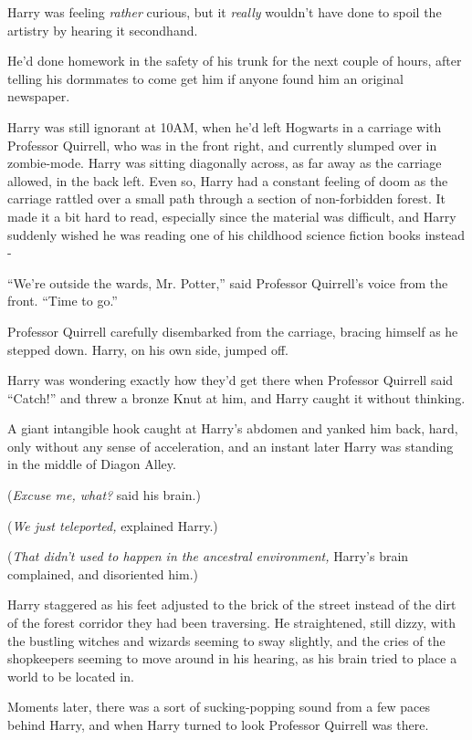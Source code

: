 Harry was feeling \emph{rather} curious, but it \emph{really} wouldn't have done to spoil the artistry by hearing it secondhand.

He'd done homework in the safety of his trunk for the next couple of hours, after telling his dormmates to come get him if anyone found him an original newspaper.

Harry was still ignorant at 10AM, when he'd left Hogwarts in a carriage with Professor Quirrell, who was in the front right, and currently slumped over in zombie-mode. Harry was sitting diagonally across, as far away as the carriage allowed, in the back left. Even so, Harry had a constant feeling of doom as the carriage rattled over a small path through a section of non-forbidden forest. It made it a bit hard to read, especially since the material was difficult, and Harry suddenly wished he was reading one of his childhood science fiction books instead -

``We're outside the wards, Mr. Potter,'' said Professor Quirrell's voice from the front. ``Time to go.''

Professor Quirrell carefully disembarked from the carriage, bracing himself as he stepped down. Harry, on his own side, jumped off.

Harry was wondering exactly how they'd get there when Professor Quirrell said ``Catch!'' and threw a bronze Knut at him, and Harry caught it without thinking.

A giant intangible hook caught at Harry's abdomen and yanked him back, hard, only without any sense of acceleration, and an instant later Harry was standing in the middle of Diagon Alley.

(\emph{Excuse me, what?} said his brain.)

(\emph{We just teleported,} explained Harry.)

(\emph{That didn't used to happen in the ancestral environment,} Harry's brain complained, and disoriented him.)

Harry staggered as his feet adjusted to the brick of the street instead of the dirt of the forest corridor they had been traversing. He straightened, still dizzy, with the bustling witches and wizards seeming to sway slightly, and the cries of the shopkeepers seeming to move around in his hearing, as his brain tried to place a world to be located in.

Moments later, there was a sort of sucking-popping sound from a few paces behind Harry, and when Harry turned to look Professor Quirrell was there.

